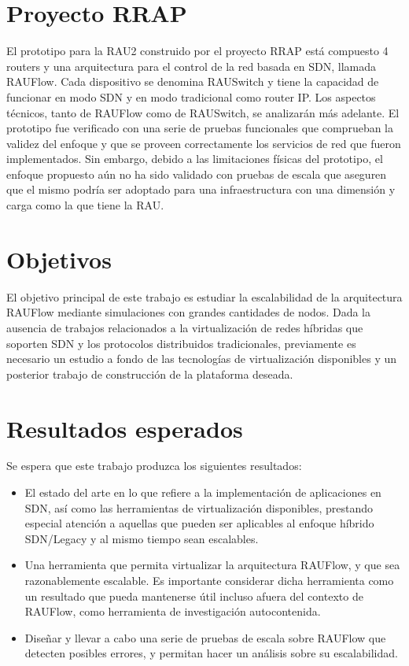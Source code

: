 \section{Proyecto RRAP}
El prototipo para la RAU2 construido por el proyecto RRAP \cite{proyecto-rrap} está compuesto 4 routers y una arquitectura para el control de la red basada en SDN, llamada RAUFlow. Cada dispositivo se denomina RAUSwitch y tiene la capacidad de funcionar en modo SDN y en modo tradicional como router IP. Los aspectos técnicos, tanto de RAUFlow como de RAUSwitch, se analizarán más adelante.
El prototipo fue verificado con una serie de pruebas funcionales que comprueban la validez del enfoque y que se proveen correctamente los servicios de red que fueron implementados.
Sin embargo, debido a las limitaciones físicas del prototipo, el enfoque propuesto aún no ha sido validado con pruebas de escala que aseguren que el mismo podría ser adoptado para una infraestructura con una dimensión y carga como la que tiene la RAU.

\section{Objetivos}
El objetivo principal de este trabajo es estudiar la escalabilidad de la arquitectura RAUFlow mediante simulaciones con grandes cantidades de nodos. Dada la ausencia de trabajos relacionados a la virtualización de redes híbridas que soporten SDN y los protocolos distribuidos tradicionales, previamente es necesario un estudio a fondo de las tecnologías de virtualización disponibles y un posterior trabajo de construcción de la plataforma deseada.

\section{Resultados esperados}
Se espera que este trabajo produzca los siguientes resultados:
\begin{itemize}
	\item El estado del arte en lo que refiere a la implementación de aplicaciones en SDN, así como las herramientas de virtualización disponibles, prestando especial atención a aquellas que pueden ser aplicables al enfoque híbrido SDN/Legacy y al mismo tiempo sean escalables.
	\item Una herramienta que permita virtualizar la arquitectura RAUFlow, y que sea razonablemente escalable. Es importante considerar dicha herramienta como un resultado que pueda mantenerse útil incluso afuera del contexto de RAUFlow, como herramienta de investigación autocontenida.
	\item Diseñar y llevar a cabo una serie de pruebas de escala sobre RAUFlow que detecten posibles errores, y permitan hacer un análisis sobre su escalabilidad.
\end{itemize}

